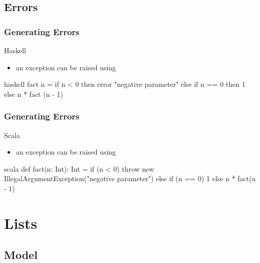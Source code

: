 \documentclass[dvipsnames]{beamer}
\theoremstyle{plain}
\begin{document}
\subsection{Errors}

\begin{frame}[fragile]
  \frametitle{Generating Errors}

  \begin{block}{Haskell}
    \begin{itemize}
      \item an exception can be raised using 
    \end{itemize}
  \end{block}

  \begin{example}
    \begin{pygments}{haskell}
fact n =
    if n < 0
    then error "negative parameter"
    else if n == 0
         then 1
         else n * fact (n - 1)
    \end{pygments}
  \end{example}
\end{frame}

\begin{frame}[fragile]
  \frametitle{Generating Errors}

  \begin{block}{Scala}
    \begin{itemize}
      \item an exception can be raised using 
    \end{itemize}
  \end{block}

  \begin{example}
    \begin{pygments}{scala}
def fact(n: Int): Int =
    if (n < 0) throw
        new IllegalArgumentException("negative parameter")
    else if (n == 0) 1
         else n * fact(n - 1)
    \end{pygments}
  \end{example}
\end{frame}

\section{Lists}

\subsection{Model}
\end{document}
